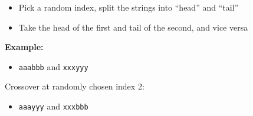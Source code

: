 \documentclass{article}
\providecommand{\tightlist}{%
      \setlength{\itemsep}{0pt}\setlength{\parskip}{0pt}}
\begin{document}
\begin{itemize}
\tightlist
\item
  Pick a random index, split the strings into ``head'' and ``tail''
\item
  Take the head of the first and tail of the second, and vice versa
\end{itemize}

\textbf{Example:}

\begin{itemize}
\tightlist
\item
  \texttt{aaabbb} and \texttt{xxxyyy}
\end{itemize}

Crossover at randomly chosen index 2:

\begin{itemize}
\tightlist
\item
  \texttt{aaa\textbar{}yyy} and \texttt{xxx\textbar{}bbb}
\end{itemize}
\end{document}
